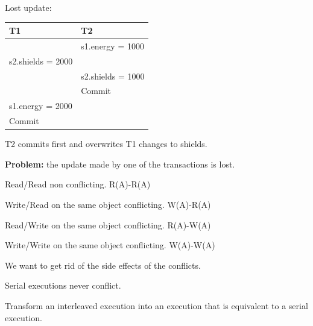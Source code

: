 \documentclass{beamer}
\begin{document}
\begin{slide}{
		\item Lost update:
		\begin{table}
			\tiny
			\begin{tabular}{l|l}
				T1 & T2\\
				\hline
				& s1.energy = 1000 \\
				s2.shields = 2000 & \\
				& s2.shields = 1000 \\
				& Commit \\
				s1.energy = 2000 & \\
				Commit & \\				
			\end{tabular}
		\end{table}	
	}\end{slide}
	
\begin{slide}{
		\item T2 commits first and overwrites T1 changes to shields.
		\item \textbf{Problem:} the update made by one of the transactions is lost.
	}\end{slide}
	
\begin{slide}{
	\item Read/Read non conflicting. R(A)-R(A)
	\item Write/Read on the same object conflicting. W(A)-R(A)
	\item Read/Write on the same object conflicting. R(A)-W(A)
	\item Write/Write on the same object conflicting. W(A)-W(A)	
}\end{slide}

\begin{slide}{
	\item We want to get rid of the side effects of the conflicts.
	\item Serial executions never conflict.
	\item Transform an interleaved execution into an execution that is equivalent to a serial execution.
}\end{slide}
\end{document}
